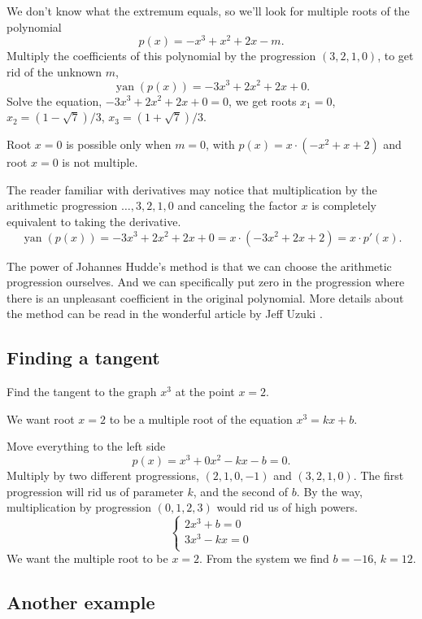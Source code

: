 \documentclass[12pt]{article}
\DeclareMathOperator{\yan}{yan}
\begin{document}
We don't know what the extremum equals, so we'll look for multiple roots of the polynomial 
\[
p(x) = -x^3 + x^2 + 2x - m.
\]
Multiply the coefficients of this polynomial by the progression $(3, 2, 1, 0)$, to get rid of the unknown $m$,
\[
\yan(p(x)) = -3x^3 + 2x^2 + 2x + 0.
\]
Solve the equation, $-3x^3 + 2x^2 + 2x + 0 = 0$, we get roots $x_1 = 0$,  $x_2 = (1 - \sqrt{7}) / 3$, $x_3 = (1 + \sqrt{7}) / 3$.

Root $x = 0$ is possible only when $m = 0$, with $p(x) = x\cdot (-x^2 + x + 2)$ and root $x = 0$ is not multiple. 

The reader familiar with derivatives may notice that multiplication by the arithmetic progression $\dots, 3, 2, 1, 0$ and canceling the factor $x$ is completely equivalent to taking the derivative. 
\[
\yan(p(x)) = -3x^3 + 2x^2 + 2x + 0 = x \cdot (-3x^2 + 2x + 2) = x \cdot p'(x).
\]

The power of Johannes Hudde's method is that we can choose the arithmetic progression ourselves. 
And we can specifically put zero in the progression where there is an unpleasant coefficient in the original polynomial.
More details about the method can be read in the wonderful article by Jeff Uzuki \cite{uzuki2005lost}.

\subsection*{Finding a tangent}

Find the tangent to the graph $x^3$ at the point $x = 2$.

We want root $x = 2$ to be a multiple root of the equation $x^3 = kx + b$.

Move everything to the left side 
\[
p(x)  = x^3 + 0x^2 - kx - b = 0.
\]
Multiply by two different progressions, $(2, 1, 0, -1)$ and $(3, 2, 1, 0)$.
The first progression will rid us of parameter $k$, and the second of $b$.
By the way, multiplication by progression $(0, 1, 2, 3)$ would rid us of high powers.
\[
\begin{cases}
    2x^3 + b = 0 \\
    3x^3 - kx = 0 \\
\end{cases}
\]
We want the multiple root to be $x = 2$.
From the system we find $b = - 16$, $k = 12$.


\subsection*{Another example}
\end{document}
